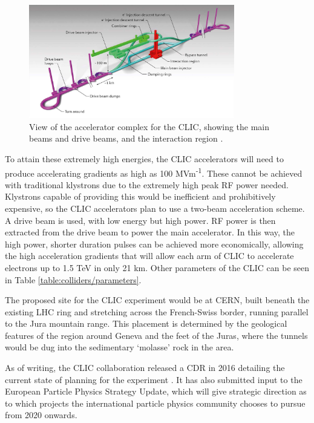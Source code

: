 \begin{figure}[h]
	\centering
	\includegraphics[width=0.8\textwidth]{../Pictures/CLIC-Render.jpg}
	\caption{View of the accelerator complex for the \acrlong{CLIC}, showing the main beams and drive beams, and the interaction region \cite{clic-schematic}.}
	\label{figure:colliders/CLIC/main}
\end{figure}

To attain these extremely high energies, the \acrshort{CLIC} accelerators will need to produce accelerating gradients as high as 100 MVm\textsuperscript{-1}. These cannot be achieved with traditional klystrons due to the extremely high peak \acrshort{RF} power needed. Klystrons capable of providing this would be inefficient and prohibitively expensive, so the \acrshort{CLIC} accelerators plan to use a two-beam acceleration scheme. A drive beam is used, with low energy but high power. \acrshort{RF} power is then extracted from the drive beam to power the main accelerator. In this way, the high power, shorter duration pulses can be achieved more economically, allowing the high acceleration gradients that will allow each arm of \acrshort{CLIC} to accelerate electrons up to 1.5 TeV in only 21 km. Other parameters of the \acrshort{CLIC} can be seen in Table \ref{table:colliders/parameters}.

The proposed site for the \acrshort{CLIC} experiment would be at \acrshort{CERN}, built beneath the existing \acrshort{LHC} ring and stretching across the French-Swiss border, running parallel to the Jura mountain range. This placement is determined by the geological features of the region around Geneva and the feet of the Juras, where the tunnels would be dug into the sedimentary `molasse' rock in the area. 

As of writing, the \acrshort{CLIC} collaboration released a \acrfull{CDR} in 2016 detailing the current state of planning for the experiment \cite{clic-cdr-main}. It has also submitted input to the European Particle Physics Strategy Update, which will give strategic direction as to which projects the international particle physics community chooses to pursue from 2020 onwards.

